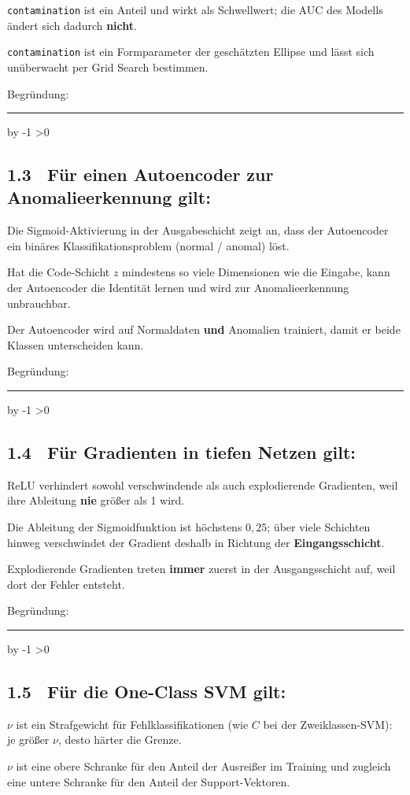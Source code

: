 \documentclass[10pt,a4paper]{article}
\newcommand{\mcbox}{\raisebox{-1pt}{\fbox{\rule{0pt}{7pt}\rule{7pt}{0pt}}}\hspace{6pt}}
\newcommand{\antwortlinien}[1]{%
  \par\vspace{2pt}%
  \newcount\zeilen \zeilen=#1
  \loop
    \noindent\rule{\linewidth}{0.4pt}\par\vspace{11pt}%
    \advance\zeilen by -1
  \ifnum\zeilen>0 \repeat
}
\begin{document}
\mcbox \texttt{contamination} ist ein Anteil und wirkt als Schwellwert; die AUC des Modells
ändert sich dadurch \textbf{nicht}.

\mcbox \texttt{contamination} ist ein Formparameter der geschätzten Ellipse und lässt sich
unüberwacht per Grid Search bestimmen.

Begründung:
\antwortlinien{2}

\subsection*{1.3 \ Für einen Autoencoder zur Anomalieerkennung gilt:}
\mcbox Die Sigmoid-Aktivierung in der Ausgabeschicht zeigt an, dass der Autoencoder ein binäres
Klassifikationsproblem (normal / anomal) löst.

\mcbox Hat die Code-Schicht $z$ mindestens so viele Dimensionen wie die Eingabe, kann der
Autoencoder die Identität lernen und wird zur Anomalieerkennung unbrauchbar.

\mcbox Der Autoencoder wird auf Normaldaten \textbf{und} Anomalien trainiert, damit er beide
Klassen unterscheiden kann.

Begründung:
\antwortlinien{2}

\subsection*{1.4 \ Für Gradienten in tiefen Netzen gilt:}
\mcbox ReLU verhindert sowohl verschwindende als auch explodierende Gradienten, weil ihre
Ableitung \textbf{nie} größer als 1 wird.

\mcbox Die Ableitung der Sigmoidfunktion ist höchstens $0{,}25$; über viele Schichten hinweg
verschwindet der Gradient deshalb in Richtung der \textbf{Eingangsschicht}.

\mcbox Explodierende Gradienten treten \textbf{immer} zuerst in der Ausgangsschicht auf, weil
dort der Fehler entsteht.

Begründung:
\antwortlinien{2}

\subsection*{1.5 \ Für die One-Class SVM gilt:}
\mcbox $\nu$ ist ein Strafgewicht für Fehlklassifikationen (wie $C$ bei der Zweiklassen-SVM):
je größer $\nu$, desto härter die Grenze.

\mcbox $\nu$ ist eine obere Schranke für den Anteil der Ausreißer im Training und zugleich eine
untere Schranke für den Anteil der Support-Vektoren.
\end{document}
